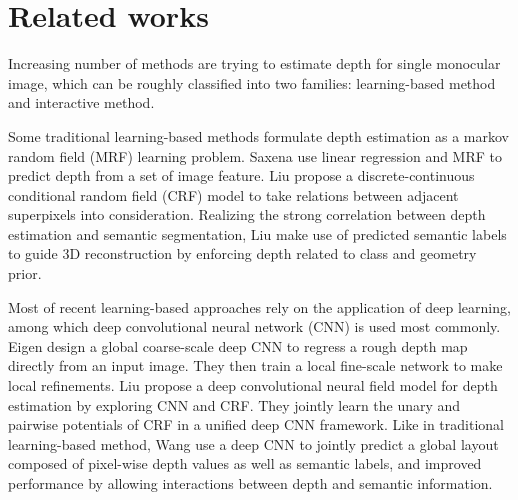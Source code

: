 \documentclass[10pt,twocolumn,letterpaper]{article}
\begin{document}

\section{Related works}

Increasing number of methods are trying to estimate depth for single monocular image, which can be roughly classified into two families: learning-based method and interactive method.

Some traditional learning-based methods formulate depth estimation as a markov random field (MRF) learning problem. Saxena \etal \cite{NIPS2005_2921} use linear regression and MRF to predict depth from a set of image feature. Liu \etal \cite{Liu_2014_CVPR} propose a discrete-continuous conditional random field (CRF) model to take relations between adjacent superpixels into consideration. Realizing the strong correlation between depth estimation and semantic segmentation, Liu \etal \cite{Liu+al:CVPR10} make use of predicted semantic labels to guide 3D reconstruction by enforcing depth related to class and geometry prior.

Most of recent learning-based approaches rely on the application of deep learning, among which deep convolutional neural network (CNN) is used most commonly. Eigen \etal \cite{DBLP:journals/corr/EigenPF14} design a global coarse-scale deep CNN to regress a rough depth map directly from an input image. They then train a local fine-scale network to make local refinements. Liu \etal \cite{Liu_2015_CVPR} propose a deep convolutional neural field model for depth estimation by exploring CNN and  CRF. They jointly learn the unary and pairwise potentials of CRF in a unified deep CNN framework. Like in traditional learning-based method, Wang \etal \cite{Wang_2015_CVPR} use a deep CNN to jointly predict a global layout composed of pixel-wise depth values as well as semantic labels, and improved performance by allowing interactions between depth and semantic information. 
\end{document}
